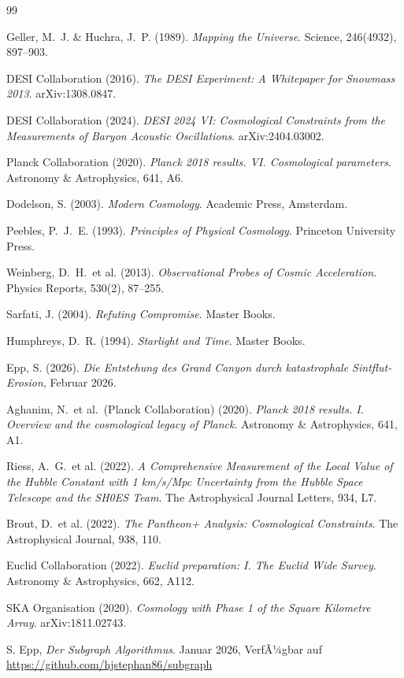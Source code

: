 ﻿\documentclass[a4paper,12pt]{article}
\theoremstyle{definition}
\theoremstyle{remark}
\begin{document}
\begin{thebibliography}{99}

  Geller, M.~J. \& Huchra, J.~P. (1989).
  \textit{Mapping the Universe}.
  Science, 246(4932), 897--903.

  DESI Collaboration (2016).
  \textit{The DESI Experiment: A Whitepaper for Snowmass 2013}.
  arXiv:1308.0847.

  DESI Collaboration (2024).
  \textit{DESI 2024 VI: Cosmological Constraints from the Measurements of
  Baryon Acoustic Oscillations}.
  arXiv:2404.03002.

  Planck Collaboration (2020).
  \textit{Planck 2018 results. VI. Cosmological parameters}.
  Astronomy \& Astrophysics, 641, A6.

  Dodelson, S. (2003).
  \textit{Modern Cosmology}.
  Academic Press, Amsterdam.

  Peebles, P.~J.~E. (1993).
  \textit{Principles of Physical Cosmology}.
  Princeton University Press.

  Weinberg, D.~H.\ et al. (2013).
  \textit{Observational Probes of Cosmic Acceleration}.
  Physics Reports, 530(2), 87--255.

  Sarfati, J. (2004).
  \textit{Refuting Compromise}.
  Master Books.

  Humphreys, D.~R. (1994).
  \textit{Starlight and Time}.
  Master Books.

  Epp, S. (2026).
  \textit{Die Entstehung des Grand Canyon durch katastrophale Sintflut-Erosion},
  Februar 2026.

  Aghanim, N.\ et al.\ (Planck Collaboration) (2020).
  \textit{Planck 2018 results. I. Overview and the cosmological legacy of
  Planck}. Astronomy \& Astrophysics, 641, A1.

  Riess, A.~G.\ et al. (2022).
  \textit{A Comprehensive Measurement of the Local Value of the Hubble
  Constant with 1 km/s/Mpc Uncertainty from the Hubble Space Telescope
  and the SH0ES Team}.
  The Astrophysical Journal Letters, 934, L7.

  Brout, D.\ et al. (2022).
  \textit{The Pantheon+ Analysis: Cosmological Constraints}.
  The Astrophysical Journal, 938, 110.

  Euclid Collaboration (2022).
  \textit{Euclid preparation: I. The Euclid Wide Survey}.
  Astronomy \& Astrophysics, 662, A112.

  SKA Organisation (2020).
  \textit{Cosmology with Phase 1 of the Square Kilometre Array}.
  arXiv:1811.02743.

  S. Epp, 
  \textit{Der Subgraph Algorithmus}. Januar 2026, VerfÃ¼gbar auf \url{https://github.com/hjstephan86/subgraph}

\end{thebibliography}
\end{document}
